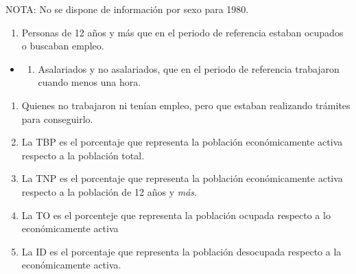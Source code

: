 \documentclass{article}
\begin{document}
NOTA: No se dispone de información por sexo para 1980.
\begin{enumerate}
\item 
Personas de 12 años y más que en el periodo de referencia estaban ocupados o buscaban empleo.

\end{enumerate}
\begin{itemize}
\item \begin{enumerate}
\item 
Asalariados y no asalariados, que en el periodo de referencia trabajaron cuando menos una hora.

\end{enumerate}

\end{itemize}
\begin{enumerate}
\item 
Quienes no trabajaron ni tenían empleo, pero que estaban realizando trámites para conseguirlo.

\item 
La TBP es el porcentaje que representa la población económicamente activa respecto a la población total.

\item 
La TNP es el porcentaje que representa la población económicamente activa respecto a la población de 12 años y \textit{más.}

\item 
La TO es el porcenteje que representa la población ocupada respecto a lo económicamente activa

\item 
La ID es el porcentaje que representa la población desocupada respecto a la económicamente activa.

\end{enumerate}
\end{document}
